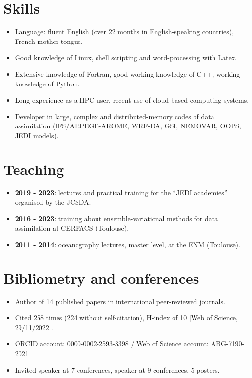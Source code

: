 \documentclass[a4paper,9pt]{scrreprt}
\begin{document}
\section*{Skills}
\begin{itemize}
\item Language: fluent English (over 22 months in English-speaking countries), French mother tongue.\vspace{-0.1cm}
\item Good knowledge of Linux, shell scripting and word-processing with Latex.\vspace{-0.1cm}
\item Extensive knowledge of Fortran, good working knowledge of C++, working knowledge of Python.\vspace{-0.1cm}
\item Long experience as a HPC user, recent use of cloud-based computing systems.\vspace{-0.1cm}
\item Developer in large, complex and distributed-memory codes of data assimilation (IFS/ARPEGE-AROME, WRF-DA, GSI, NEMOVAR, OOPS, JEDI models).\vspace{-0.1cm}
\end{itemize}

\section*{Teaching}
\begin{itemize}
\item \textbf{2019 - 2023}: lectures and practical training for the ``JEDI academies'' organised by the JCSDA.\vspace{-0.1cm}
\item \textbf{2016 - 2023}: training about ensemble-variational methods for data assimilation at CERFACS (Toulouse).\vspace{-0.1cm}
\item \textbf{2011 - 2014}: oceanography lectures, master level, at the ENM (Toulouse).\vspace{-0.1cm}
\end{itemize}

\section*{Bibliometry and conferences}
\begin{itemize}
\item Author of 14 published papers in international peer-reviewed journals.\vspace{-0.1cm}
\item Cited 258 times (224 without self-citation), H-index of 10 [Web of Science, 29/11/2022].\vspace{-0.1cm}
\item ORCID account: 0000-0002-2593-3398 / Web of Science account: ABG-7190-2021\vspace{-0.1cm}
\item Invited speaker at 7 conferences, speaker at 9 conferences, 5 posters.\vspace{-0.1cm}
\end{itemize}
\end{document}
